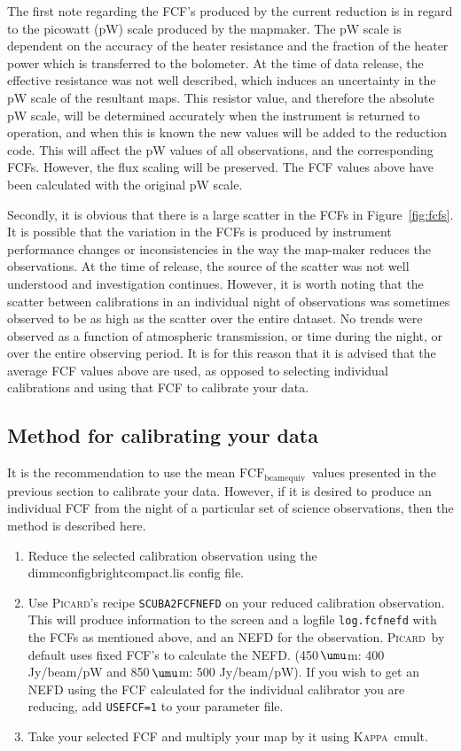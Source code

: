 \documentclass[twoside,11pt]{article}
\newcommand{\micron}{\mbox{\,${\umu}$m}}            %
\newcommand{\xref}[3]{#1}
\renewcommand{\_}{\texttt{\symbol{95}}}
\newcommand{\fcfbe}{$\mathrm{FCF_{beamequiv}}$}
\newcommand{\Kappa}{\xref{\textsc{Kappa}}{sun95}{}}
\newcommand{\picard}{\xref{\textsc{Picard}}{sun231}{}}
\newcommand{\drrecipe}[1]{\texttt{#1}}
\newcommand{\task}[1]{\textsf{#1}}
\newcommand{\cmult}{\xref{\task{cmult}}{sun95}{CMULT}}
\begin{document}
The first note regarding the FCF's produced by the current reduction
is in regard to the picowatt (pW) scale produced by the mapmaker. The
pW scale is dependent on the accuracy of the heater resistance and the
fraction of the heater power which is transferred to the bolometer. At
the time of data release, the effective resistance was not well
described, which induces an uncertainty in the pW scale of the
resultant maps. This resistor value, and therefore the absolute pW
scale, will be determined accurately when the instrument is returned
to operation, and when this is known the new values will be added to
the reduction code. This will affect the pW values of all
observations, and the corresponding FCFs. However, the flux scaling
will be preserved. The FCF values above have been calculated with the
original pW scale.

Secondly, it is obvious that there is a large scatter in the FCFs in
Figure~\ref{fig:fcfs}. It is possible that the variation in the FCFs
is produced by instrument performance changes or inconsistencies in
the way the map-maker reduces the observations. At the time of
release, the source of the scatter was not well understood and
investigation continues. However, it is worth noting that the scatter
between calibrations in an individual night of observations was
sometimes observed to be as high as the scatter over the entire
dataset. No trends were observed as a function of atmospheric
transmission, or time during the night, or over the entire observing
period. It is for this reason that it is advised that the average FCF
values above are used, as opposed to selecting individual calibrations
and using that FCF to calibrate your data.

\subsection{Method for calibrating your data}


It is the recommendation to use the mean \fcfbe\ values
presented in the previous section to calibrate your data. However, if
it is desired to produce an individual FCF from the night of a
particular set of science observations, then the method is described
here.

\begin{enumerate}
\item{Reduce the selected calibration observation using the
dimmconfig\_bright\_compact.lis config file.}
\item{Use \picard's recipe \drrecipe{SCUBA2\_FCFNEFD} on your reduced calibration
    observation. This will produce information to the screen and a
    logfile \texttt{log.fcfnefd} with the FCFs as mentioned above, and an NEFD
    for the observation. \picard\ by default uses fixed FCF's to
    calculate the NEFD. (450\micron: 400 Jy/beam/pW and 850\micron: 500
    Jy/beam/pW). If you wish to get an NEFD using the FCF calculated
    for the individual calibrator you are reducing, add \texttt{USEFCF=1} to
    your parameter file. }
\item{Take your selected FCF and multiply your map by it using \Kappa\
    \cmult.}
\end{enumerate}
\end{document}
